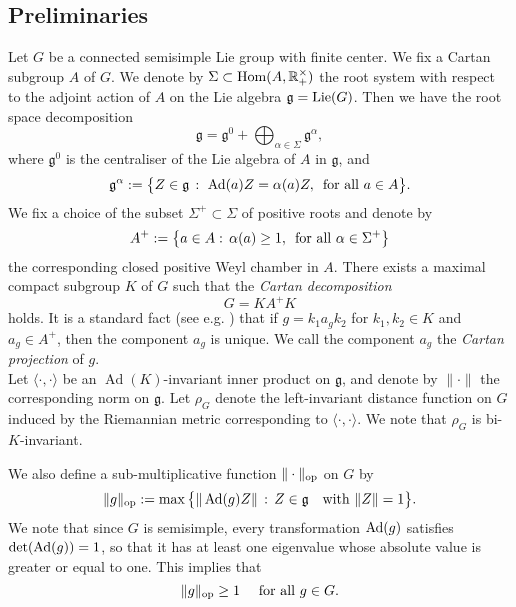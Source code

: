 \documentclass[11pt,reqno,a4paper]{amsart}
\numberwithin{equation}{section}
\newcommand{\GL}{\operatorname{GL}}
\newcommand{\gog}{\mathfrak{g}}
\newcommand{\ra}{\rightarrow}
\newcommand{\qand}{\quad \textrm{and} \quad}
\DeclareMathOperator{\Ad}{Ad}
\DeclareMathOperator{\End}{End}
\theoremstyle{theorem}
\theoremstyle{definition}
\begin{document}


\subsection{Preliminaries}
\label{Subsec:notation}
Let $G$ be a connected semisimple Lie group with finite center.
We fix a Cartan subgroup $A$ of $G$. We denote by $\Sigma\subset \hbox{Hom}(A,\mathbb{R}_+^\times)$  the root system with respect to the adjoint action of $A$ on the Lie algebra $\gog=\hbox{Lie}(G)$.
Then we have the root space decomposition 
\begin{equation}
\label{eq:roots}
\gog = \gog^0 + \bigoplus_{\alpha \in \Sigma} \gog^\alpha,
\end{equation}
where $\gog^0$ is the centraliser of  the Lie algebra of $A$ in $\gog$, and 
\[
\gog^\alpha := \big\{ Z \in \gog \, : \,\, \Ad(a)Z = \alpha(a) Z, \enskip \textrm{for all $a \in A$}  \big\}.
\]
We fix a choice of the subset $\Sigma^+\subset \Sigma$ of positive roots and denote by 
$$
A^+:=\big\{a\in A:\, \alpha(a)\ge 1, \enskip \textrm{for all $\alpha \in \Sigma^+$}  \big\}
$$
the corresponding closed positive Weyl chamber in $A$. There exists a maximal compact subgroup $K$ of 
$G$ such that the \emph{Cartan decomposition} 
\begin{equation}
\label{eq:cartan}
G=KA^+K
\end{equation}
holds. 
It is a standard fact (see e.g. \cite[Ch.~9]{Hel}) that 
if $g=k_1 a_g k_2$ for $k_1, k_2 \in K$ and $a_g\in A^{+}$, then the component $a_g$ is unique.
We call the component $a_g$ the \emph{Cartan projection} of $g$. \\

Let $\langle \cdot, \cdot \rangle$ be an $\Ad(K)$-invariant inner product on $\gog$, and denote by $\| \cdot \|$ the 
corresponding norm on $\gog$. Let $\rho_G$ denote the left-invariant distance function on $G$ induced by the 
Riemannian metric corresponding to $\langle \cdot, \cdot \rangle$. 
We note that $\rho_G$ is bi-$K$-invariant.

We also define a sub-multiplicative function 
$\|\cdot\|_{\rm op}$ on $G$ by
\begin{equation}
\label{def*}
\|g\|_{\rm op} := \max\big\{ \|\Ad(g)Z\| \, : \, Z\in\gog\quad\hbox{with $\|Z\| = 1$} \big\}.
\end{equation}
We note that since $G$ is semisimple, every transformation $\hbox{Ad}(g)$ satisfies $\det(\hbox{Ad}(g))=1$, so that 
it has at least one eigenvalue whose absolute value is greater or equal to one. 
This implies that
$$
\|g\|_{\rm op}\ge 1\quad\hbox{ for all $g\in G$.}
$$
\end{document}
